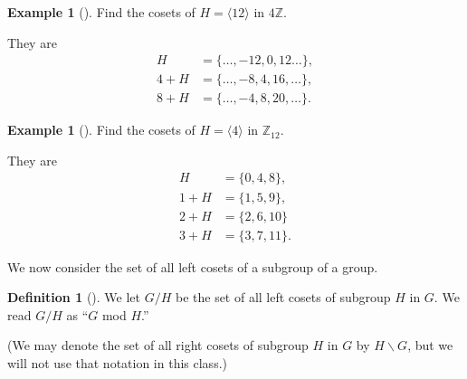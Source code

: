 \documentclass[10pt,openany,oneside]{book}
\theoremstyle{plain}
\theoremstyle{definition}
\newtheorem{definition}[theorem]{Definition}
\theoremstyle{definition}
\theoremstyle{definition}
\newtheorem{example}[theorem]{Example}
\theoremstyle{definition}
\numberwithin{equation}{section}
\def\Z{\mathbb{Z}}
\newcommand{\amp}{&}
\begin{document}
\begin{example}[]\label{example-71}
Find the cosets of \(H=\langle 12\rangle\) in \(4\Z\).%
\par
They are%
\begin{align*}
H\amp =\{\ldots, -12,0,12\ldots\},\\
4+H \amp =
\{\ldots,-8,4,16,\ldots\},\\
8+H\amp =\{\ldots, -4,8,20,\ldots\}.
\end{align*}
%
\end{example}
\begin{example}[]\label{z6_ex}
Find the cosets of \(H=\langle 4\rangle\) in \(\Z_{12}\).%
\par
They are%
\begin{align*}
H\amp =\{0,4,8\},\\
1+H \amp = \{1,5,9\},\\
2+H\amp =\{2,6,10\}\\
3+H\amp =\{3,7,11\}.
\end{align*}
%
\end{example}
We now consider the set of all left cosets of a subgroup of a group.%
\begin{definition}[{}]\label{definition-62}
\label{notation-72}
We let \(G/H\) be the set of all left cosets of subgroup \(H\) in \(G\). We read \(G/H\) as ``\(G\) mod \(H\).''%
\par
(We may denote the set of all right cosets of subgroup \(H\) in \(G\) by \(H\backslash G\), but we will  not use that notation in this class.)%
\end{definition}
\typeout{************************************************}
\typeout{************************************************}
\end{document}
